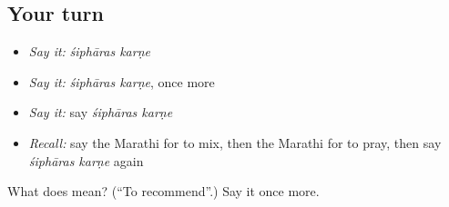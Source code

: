\subsection*{Your turn}
\begin{itemize}
\raggedright
  \item \emph{Say it:} \emph{śiphāras karṇe}
  \item \emph{Say it:} \emph{śiphāras karṇe}, once more
  \item \emph{Say it:} say \emph{śiphāras karṇe}
  \item \emph{Recall:} say the Marathi for to mix, then the Marathi for to pray, then say \emph{śiphāras karṇe} again
\end{itemize}

\begin{tcolorbox}[breakable,colback=teal!4,colframe=teal!35!black,title={Before you move on}]
What does   mean? (\textquotedblleft{}To recommend\textquotedblright{}.) Say it once more.
\end{tcolorbox}
